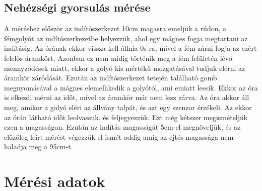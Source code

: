 \documentclass[10pt,pdftex]{report}
\begin{document}
\subsection*{Nehézségi gyorsulás mérése}
A méréshez először az indítószerkezet 10cm magasra emeljük a rúdon, a fémgolyót az indítószerkezetbe helyezzük, ahol egy mágnes fogja megtartani az indításig. Az órának ekkor vissza kell állnia 0s-ra, mivel a fém zárni fogja az ezért felelős áramkört. Azonban ez nem midig történik meg a fém felületén lévő szennyződések miatt, ekkor a golyó kis mértékű mozgatásával tudjuk elérni az áramkör záródását. Ezután az indítószerkezet tetején található gomb megnyomásával a mágnes elemelhkedik a golyótól, ami emiatt leesik. Ekkor az óra is elkezdi mérni az időt, mivel az áramkör már nem lesz zárva. Az óra akkor áll meg, amikor a golyó eléri az állvány talpát, és azt egy szenzor érzékeli. Az ekkor az órán látható időt leolvassuk, és feljegyezzük. Ezt még kétszer megismételjük ezen a magasságon. Ezután az indítás magasságát 5cm-el megnöveljük, és az előzőleg leírt mérést végezzük el ismét addig amíg az ejtés magassága nem haladja meg a 95cm-t.
\section*{Mérési adatok}
\end{document}
